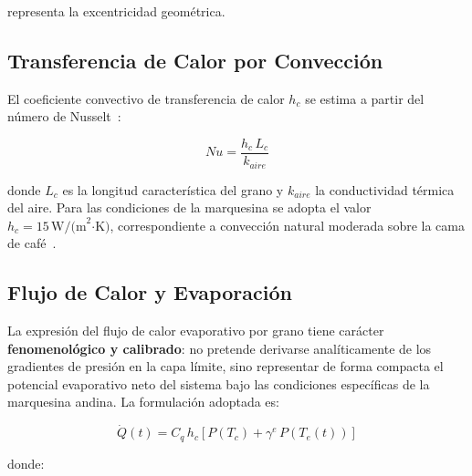 \documentclass[conference]{IEEEtran}
\begin{document}
representa la excentricidad geométrica.

\subsection{Transferencia de Calor por Convección}

El coeficiente convectivo de transferencia de calor $h_c$ se estima a partir del número de Nusselt~\cite{cerci19}:

\begin{equation}
Nu = \frac{h_c\,L_c}{k_{aire}}
\end{equation}

donde $L_c$ es la longitud característica del grano y $k_{aire}$ la conductividad térmica del aire. Para las condiciones de la marquesina se adopta el valor $h_c = 15\,\text{W/(m}^2\text{·K)}$, correspondiente a convección natural moderada sobre la cama de café~\cite{ciro10}.

\subsection{Flujo de Calor y Evaporación}

La expresión del flujo de calor evaporativo por grano tiene carácter \textbf{fenomenológico y calibrado}: no pretende derivarse analíticamente de los gradientes de presión en la capa límite, sino representar de forma compacta el potencial evaporativo neto del sistema bajo las condiciones específicas de la marquesina andina. La formulación adoptada es:

\begin{equation}
\dot{Q}(t)
=
C_q\, h_c
\left[
P(T_c)
+
\gamma^e\, P(T_e(t))
\right]
\label{eq:Qdot}
\end{equation}

donde:
\end{document}

